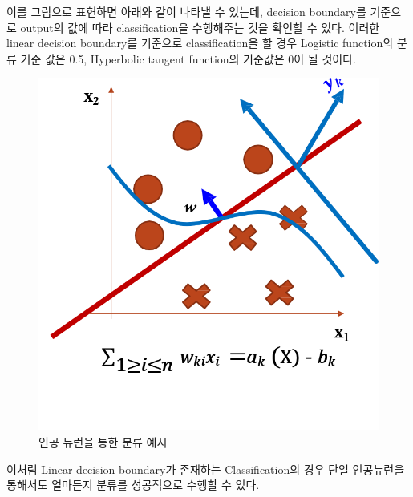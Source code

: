 \documentclass[draft=false]{oblivoir}
\begin{document}
이를 그림으로 표현하면 아래와 같이 나타낼 수 있는데, decision boundary를 기준으로 output의 값에 따라 classification을 수행해주는 것을 확인할 수 있다. 이러한 linear decision boundary를 기준으로 classification을 할 경우 Logistic function의 분류 기준 값은 0.5, Hyperbolic tangent function의 기준값은 0이 될 것이다. 
\begin{figure}[ht] \centering 
\includegraphics[scale=0.4]{fig14_9.png} 
\caption{인공 뉴런을 통한 분류 예시}
\label{fig:14-9}
\end{figure}
이처럼 Linear decision boundary가 존재하는 Classification의 경우 단일 인공뉴런을 통해서도 얼마든지 분류를 성공적으로 수행할 수 있다. 
\end{document}
